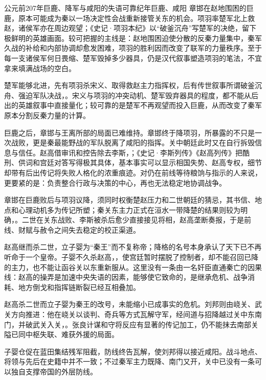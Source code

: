 \begin{event}{公元前207年}{巨鹿、降军与咸阳的失语}{可靠纪年}{巨鹿、咸阳}
章邯在赵地围困的巨鹿，原本可能成为秦以一场决定性会战重新接管关东的机会。项羽率楚军北上救赵，诸侯军亦在周边观望；《史记·项羽本纪》以“破釜沉舟”写楚军的决绝，留下极鲜明的英雄画面。较可把握的主线是：赵地围困迫使分散的反秦力量集中，秦军久战的补给和内部协调却愈发困难，项羽的胜利因而改变了联军的力量秩序。至于每一支诸侯军何日畏缩、楚军毁掉多少器具，仍是汉代叙事塑造项羽的笔法，不宜拿来填满战场的空白。

楚军能够北进，先有项羽杀宋义、取得救赵主力指挥权，后有传世叙事所谓破釜沉舟、强迫军队决战，。宋义与项羽的冲突动机、楚军毁弃器具的程度，都不能从后出的英雄叙事中直接量化；较可靠的是楚军不再观望而投入巨鹿，从而改变了秦军原本分割反秦力量的计算。

巨鹿之后，章邯与王离所部的局面已难维持。章邯终于降项羽，所暴露的不只是一次战败，更是秦最能野战的军队脱离了咸阳的指挥。关中朝廷此时又在自行拆毁信息与信任。赵高借审讯和控告除去李斯，；《史记·李斯列传》《赵高列传》把酷刑、供词和宫廷对答写得极其具体，基本事实可以显示相国失势、赵高专权，细节却带有后出传记将失败人格化的浓重痕迹。对仍在前线等待粮饷与指示的人来说，更要紧的是：负责整合行政与决策的中心，再也无法稳定地协调战争。

章邯在巨鹿败后与项羽议降，须同时权衡楚赵压力和二世朝廷的猜忌，其书信、地点和心理动机多为传记所塑；秦关东主力正式在洹水一带降楚的结果则较为明确，。二世在关东战败、李斯被杀后愈少直接接见将相，赵高垄断奏报，于是前线、财赋与赦令之间失去稳定的校正渠道。

赵高继而杀二世，立子婴为“秦王”而不复称帝；降格的名号本身承认了天下已不再听命于一个皇帝。子婴不久杀赵高，，使宫廷暂时摆脱了控制者，却不能召回已降的主力，也不能让函谷关以东重新服从。这里没有一条由一名奸臣直通秦亡的因果线：赵高的操弄是加速中央失语的因素，能够使它致命的，是继承危机、战争消耗、地方倒戈和指挥链断裂已经互相叠加。

赵高杀二世而立子婴为秦王的改号，未能缩小已成事实的危机。刘邦则由峣关、武关方向推进：他在峣关以谈判、奇兵等方式瓦解守军，经间道与招降越过关中东南门，并破武关入关，。张良计谋和守将反应有显著的传记加工，仍不能抹去南部关隘已同中枢失联、难获外援的局面。

子婴仓促在蓝田集结残军阻截，防线终告瓦解，使刘邦得以接近咸阳。战斗地点、将领与先后在史籍中并不一致；不过秦军主力既降、南门又开，关中已没有一条可以独自支撑帝国的外层防线。

\end{event}

